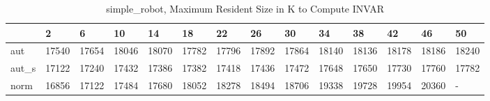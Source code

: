 \begin{table}
\caption{simple_robot, Maximum Resident Size in K to Compute INVAR}
\label{simple_robot_INVAR_size}
\begin{tabular}{llllllllllllll}
\toprule
 & 2 & 6 & 10 & 14 & 18 & 22 & 26 & 30 & 34 & 38 & 42 & 46 & 50 \\
\midrule
aut & 17540 & 17654 & 18046 & 18070 & 17782 & 17796 & 17892 & 17864 & 18140 & 18136 & 18178 & 18186 & 18240 \\
aut_s & 17122 & 17240 & 17432 & 17386 & 17382 & 17418 & 17436 & 17472 & 17648 & 17650 & 17730 & 17760 & 17782 \\
norm & 16856 & 17122 & 17484 & 17680 & 18052 & 18278 & 18494 & 18706 & 19338 & 19728 & 19954 & 20360 & - \\
\bottomrule
\end{tabular}
\end{table}
